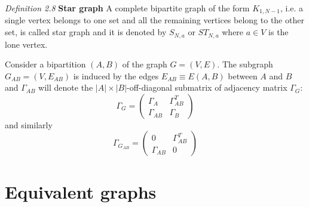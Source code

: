 \documentclass[10pt,a4paper]{book}
\numberwithin{equation}{chapter}
\numberwithin{figure}{chapter}
\numberwithin{table}{chapter}
\begin{document}
\textit{Definition 2.8} \textbf{Star graph} A complete bipartite graph of the form $K_{1, N-1}$, i.e. a single vertex belongs to one set and all the remaining vertices belong to the other set, is called star graph and it is denoted by $S_{N,a}$ or $ST_{N,a}$ where $a \in V$ is the lone vertex. 

Consider a bipartition $(A,B)$ of the graph $G=(V,E)$. The subgraph $G_{AB}=(V,E_{AB})$ is induced by the edges $E_{AB}\equiv E(A,B)$ between $A$ and $B$ and $\Gamma_{AB}$ will denote the $|A|\times |B|$-off-diagonal submatrix of adjacency matrix $\Gamma_G$:
\begin{equation}
\Gamma_G = \left(\begin{array}{cc} \Gamma_{A} & \Gamma^{T}_{AB} \\ \Gamma_{AB}& \Gamma_{B} \end{array}\right)
\end{equation}
and similarly 
\begin{equation}
\Gamma_{G_{AB}} = \left(\begin{array}{cc} 0 & \Gamma^{T}_{AB} \\ \Gamma_{AB}& 0 \end{array}\right)
\end{equation}

\section{Equivalent graphs}\label{sec:eqGRAPH}
\end{document}
